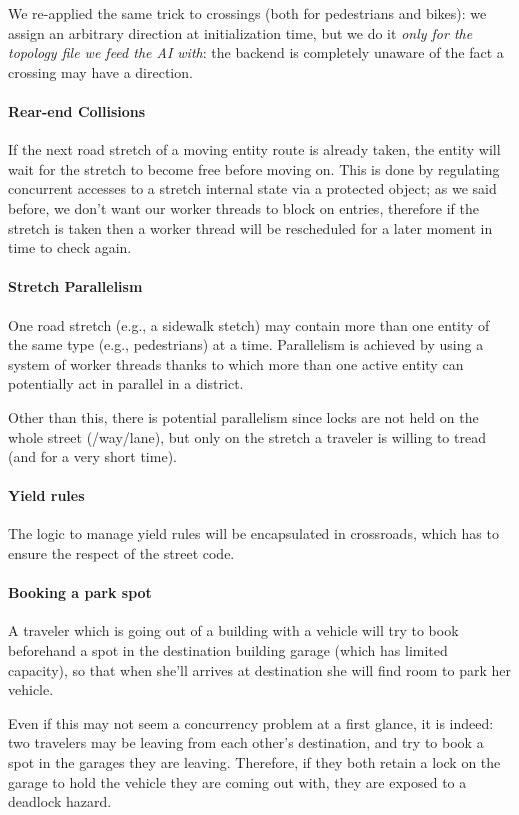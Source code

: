 We re-applied the same trick to crossings (both for pedestrians and bikes): we
assign an arbitrary direction at initialization time, but we do it
\textit{only for the topology file we feed the AI with}: the backend is
completely unaware of the fact a crossing may have a direction.

\paragraph{Rear-end Collisions}
If the next road stretch of a moving entity route is already taken, the entity
will wait for the stretch to become free before moving on.
This is done by regulating concurrent accesses to a stretch internal state via
a protected object; as we said before, we don't want our worker threads to
block on entries, therefore if the stretch is taken then a worker thread will
be rescheduled for a later moment in time to check again.

\paragraph{Stretch Parallelism}
One road stretch (e.g., a sidewalk stetch) may contain more than one entity of
the same type (e.g., pedestrians) at a time.
Parallelism is achieved by using a system of worker threads thanks to which
more than one active entity can potentially act in parallel in a district.

Other than this, there is potential parallelism since locks are not held on the
whole street (/way/lane), but only on the stretch a traveler is willing to
tread (and for a very short time).

\paragraph{Yield rules}
The logic to manage yield rules will be encapsulated in crossroads, which has
to ensure the respect of the street code.

\paragraph{Booking a park spot}
A traveler which is going out of a building with a vehicle will try to book
beforehand a spot in the destination building garage (which has limited
capacity), so that when she'll arrives at destination she will find room to
park her vehicle.

Even if this may not seem a concurrency problem at a first glance, it is
indeed: two travelers may be leaving from each other's destination, and try
to book a spot in the garages they are leaving.
Therefore, if they both retain a lock on the garage to hold the vehicle they
are coming out with, they are exposed to a deadlock hazard.

